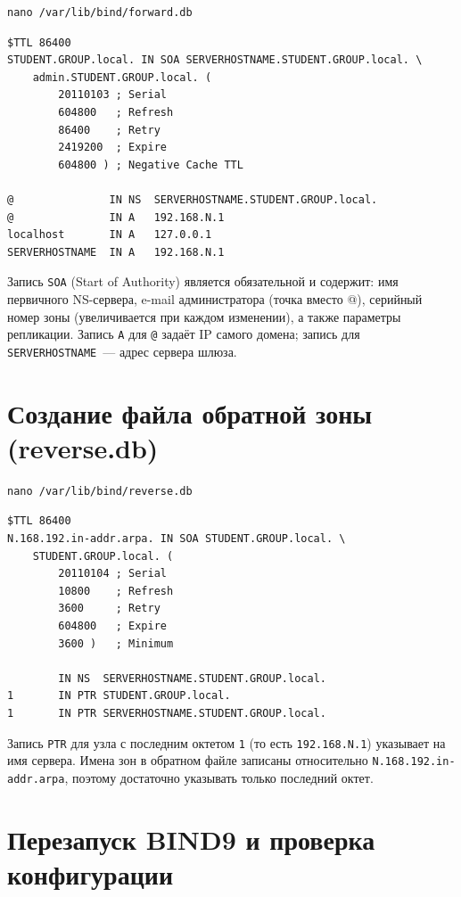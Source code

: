 \documentclass[a4paper,14pt,oneside,openany]{memoir}
\begin{document}
\begin{lstlisting}
nano /var/lib/bind/forward.db
\end{lstlisting}

\begin{lstlisting}
$TTL 86400
STUDENT.GROUP.local. IN SOA SERVERHOSTNAME.STUDENT.GROUP.local. \
    admin.STUDENT.GROUP.local. (
        20110103 ; Serial
        604800   ; Refresh
        86400    ; Retry
        2419200  ; Expire
        604800 ) ; Negative Cache TTL

@               IN NS  SERVERHOSTNAME.STUDENT.GROUP.local.
@               IN A   192.168.N.1
localhost       IN A   127.0.0.1
SERVERHOSTNAME  IN A   192.168.N.1
\end{lstlisting}

Запись \texttt{SOA} (Start of Authority) является обязательной и содержит: имя первичного NS-сервера, e-mail администратора (точка вместо @), серийный номер зоны (увеличивается при каждом изменении), а также параметры репликации. Запись \texttt{A} для \texttt{@} задаёт IP самого домена; запись для \texttt{SERVERHOSTNAME}~--- адрес сервера шлюза.

\section{Создание файла обратной зоны (reverse.db)}

\begin{lstlisting}
nano /var/lib/bind/reverse.db
\end{lstlisting}

\begin{lstlisting}
$TTL 86400
N.168.192.in-addr.arpa. IN SOA STUDENT.GROUP.local. \
    STUDENT.GROUP.local. (
        20110104 ; Serial
        10800    ; Refresh
        3600     ; Retry
        604800   ; Expire
        3600 )   ; Minimum

        IN NS  SERVERHOSTNAME.STUDENT.GROUP.local.
1       IN PTR STUDENT.GROUP.local.
1       IN PTR SERVERHOSTNAME.STUDENT.GROUP.local.
\end{lstlisting}

Запись \texttt{PTR} для узла с последним октетом \texttt{1} (то есть \texttt{192.168.N.1}) указывает на имя сервера. Имена зон в обратном файле записаны относительно \texttt{N.168.192.in-addr.arpa}, поэтому достаточно указывать только последний октет.

\section{Перезапуск BIND9 и проверка конфигурации}
\end{document}
